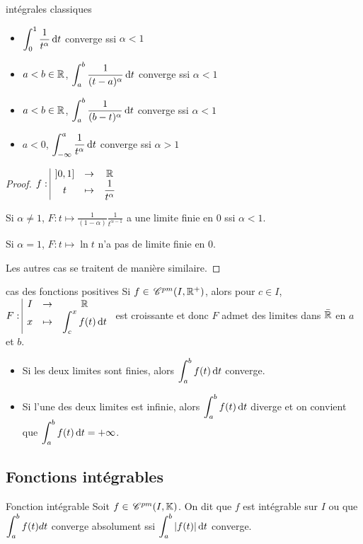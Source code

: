 \begin{theoreme}{intégrales classiques}{}
    
    \begin{itemize}
        \item $\displaystyle \int_0^1 \frac{1}{t^\alpha} \,\mathrm{d}t$ converge ssi $\alpha < 1$
        \item $a < b \in \mathbb{R}$, $\displaystyle \int_{a }^{b } \frac 1 {(t - a)^\alpha} \,\mathrm{d}t$ converge ssi $\alpha < 1$
        \item $a < b \in \mathbb{R}$, $\displaystyle \int_{a }^{b } \frac 1 {(b - t)^\alpha} \,\mathrm{d}t$ converge ssi $\alpha < 1$
        \item $a < 0$, $\displaystyle \int_{- \infty}^a \frac 1 {t^\alpha} \,\mathrm{d}t$ converge ssi $\alpha > 1$
    \end{itemize}
\end{theoreme}

\begin{proof}
    $f: \space \begin{array}{|ccc} \displaystyle ]0, 1] & \to & \displaystyle \mathbb{R} \\ \displaystyle t & \mapsto & \displaystyle \frac{1}{t^\alpha} \end{array}$ 

    Si $\alpha \neq 1$, $F : t \mapsto \frac 1 {(1 - \alpha)} \frac{1}{t^{\alpha - 1}}$ a 
    une limite finie en $0$ ssi $\alpha < 1$. 

    Si $\alpha = 1$, $F : t \mapsto \ln t$ n'a pas de limite finie en $0$.

    Les autres cas se traitent de manière similaire. 
\end{proof}


\begin{proposition}{cas des fonctions positives}{}
    Si $f \in \,\mathscr C^{pm}(I, \mathbb{R}^+)$, alors pour $c \in I$, $F: \space \begin{array}{|ccc} \displaystyle I & \to & \displaystyle \mathbb{R} \\ \displaystyle x & \mapsto & \displaystyle \int_c^x f(t) \,\mathrm{d}t \end{array}$ est croissante
    et donc $F$ admet des limites dans $\bar {\mathbb{R}}$ en $a$ et $b$.

    \begin{itemize}
        \item Si les deux limites sont finies, alors $\displaystyle \int_a^b f(t) \,\mathrm{d}t$ converge.
        \item Si l'une des deux limites est infinie, alors $\displaystyle \int_a^b f(t) \,\mathrm{d}t$ diverge et on convient 
        que $\displaystyle \int_a^b f(t) \,\mathrm{d}t = + \infty$.
    \end{itemize}
\end{proposition}


\subsection{Fonctions intégrables }

\begin{definition}{Fonction intégrable}{}
    Soit $f \in \,\mathscr C^{pm}(I, \mathbb{K})$. On dit que $f$ est intégrable sur $I$ ou que 
    $\displaystyle \int_a^b f(t) dt$ converge absolument ssi $\displaystyle \int_a^b |f(t)| \,\mathrm{d}t$ converge.
\end{definition}

